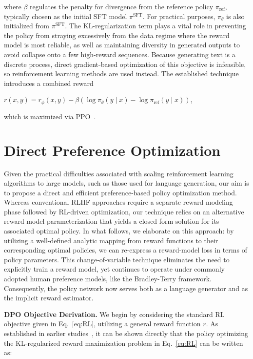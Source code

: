 where $\beta$ regulates the penalty for divergence from the reference policy $\pi_\text{ref}$, typically chosen as the initial SFT model $\pi^\text{SFT}$. For practical purposes, $\pi_\theta$ is also initialized from $\pi^\text{SFT}$. The KL-regularization term plays a vital role in preventing the policy from straying excessively from the data regime where the reward model is most reliable, as well as maintaining diversity in generated outputs to avoid collapse onto a few high-reward sequences. Because generating text is a discrete process, direct gradient-based optimization of this objective is infeasible, so reinforcement learning methods are used instead. The established technique~\citep{ziegler2020finetuning, stiennon2022learning, bai2022training, ouyang2022training} introduces a combined reward

${r(x, y) = r_{\phi}(x, y) -\beta (\log \pi_{\theta}(y\mid x) - \log \pi_\text{ref}(y\mid x))}$,

which is maximized via PPO~\cite{schulman2017proximal}.

\section{Direct Preference Optimization}\label{sec:DPO}

Given the practical difficulties associated with scaling reinforcement learning algorithms to large models, such as those used for language generation, our aim is to propose a direct and efficient preference-based policy optimization method. Whereas conventional RLHF approaches require a separate reward modeling phase followed by RL-driven optimization, our technique relies on an alternative reward model parameterization that yields a closed-form solution for its associated optimal policy. In what follows, we elaborate on this approach: by utilizing a well-defined analytic mapping from reward functions to their corresponding optimal policies, we can re-express a reward-model loss in terms of policy parameters. This change-of-variable technique eliminates the need to explicitly train a reward model, yet continues to operate under commonly adopted human preference models, like the Bradley-Terry framework. Consequently, the policy network now serves both as a language generator and as the implicit reward estimator.

\textbf{DPO Objective Derivation.} We begin by considering the standard RL objective given in Eq.~\ref{eq:RL}, utilizing a general reward function $r$. As established in earlier studies~\citep{peters2007reinforcement, peng2019advantage, korbak2022reinforcement, go2023aligning}, it can be shown directly that the policy optimizing the KL-regularized reward maximization problem in Eq.~\ref{eq:RL} can be written as:

